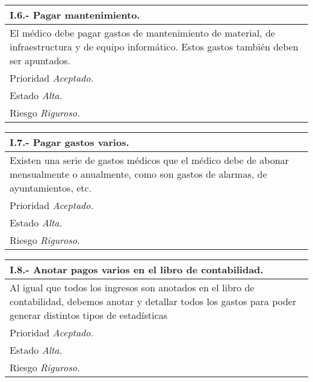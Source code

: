 \documentclass[a4paper,oneside,11pt]{book}
\begin{document}
\begin{center}
\begin{tabulary}{15cm}{|L|}
	\hline
		\bf{I.6.- Pagar mantenimiento.} \\
	\hline
		El médico debe pagar gastos de mantenimiento de material, de infraestructura y de equipo informático. Estos gastos también deben ser apuntados. \\
	\hline
		Prioridad \textit{Aceptado.} \\
	\hline
		Estado \textit{Alta.} \\
	\hline
		Riesgo \textit{Riguroso.} \\
	\hline
\end{tabulary}
\end{center}

\begin{center}
\begin{tabulary}{15cm}{|L|}
	\hline
		\bf{I.7.- Pagar gastos varios.} \\
	\hline
		Existen una serie de gastos médicos que el médico debe de abonar mensualmente o anualmente, como son gastos de alarmas, de ayuntamientos, etc. \\
	\hline
		Prioridad \textit{Aceptado.} \\
	\hline
		Estado \textit{Alta.} \\
	\hline
		Riesgo \textit{Riguroso.} \\
	\hline
\end{tabulary}
\end{center}

\begin{center}
\begin{tabulary}{15cm}{|L|}
	\hline
		\bf{I.8.- Anotar pagos varios en el libro de contabilidad.} \\
	\hline
		Al igual que todos los ingresos son anotados en el libro de contabilidad, debemos anotar y detallar todos los gastos para poder generar distintos tipos de estadísticas\\
	\hline
		Prioridad \textit{Aceptado.} \\
	\hline
		Estado \textit{Alta.} \\
	\hline
		Riesgo \textit{Riguroso.} \\
	\hline
\end{tabulary}
\end{center}
\end{document}
